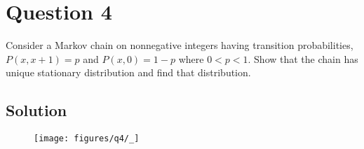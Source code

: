 \section*{Question 4}

Consider a Markov chain on nonnegative integers having transition probabilities, \( P(x, x+1)=p \) and \( P(x, 0)=1-p \) where \( 0<p<1 \).
Show that the chain has unique stationary distribution and find that distribution.

\subsection*{Solution}

\begin{figure}[h]
    \centering
    \texttt{[image: figures/q4/\_]}
\end{figure}
